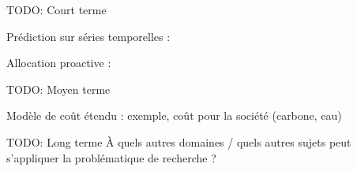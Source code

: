 TODO: Court terme


Prédiction sur séries temporelles : \cite{bauerTimeSeriesForecasting2020}

Allocation proactive : \cite{parkGraphNeuralNetworkBased2024}

TODO: Moyen terme

Modèle de coût étendu : exemple, coût pour la société (carbone, eau) \cite{rickeCountrylevelSocialCost2018}


TODO: Long terme
À quels autres domaines / quels autres sujets peut s'appliquer la problématique de recherche ?
